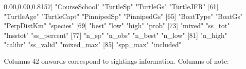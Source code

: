 \documentclass[
]{book}
\newenvironment{Shaded}{\begin{snugshade}}{\end{snugshade}}
\newcommand{\DecValTok}[1]{\textcolor[rgb]{0.00,0.00,0.81}{#1}}
\newcommand{\NormalTok}[1]{#1}
\newcommand{\StringTok}[1]{\textcolor[rgb]{0.31,0.60,0.02}{#1}}
\begin{document}
\begin{Shaded}
\begin{Highlighting}[]
\NormalTok{[}\DecValTok{57}\NormalTok{] }\StringTok{"CourseSchool"}     \StringTok{"TurtleSp"}         \StringTok{"TurtleGs"}         \StringTok{"TurtleJFR"}       
\NormalTok{[}\DecValTok{61}\NormalTok{] }\StringTok{"TurtleAge"}        \StringTok{"TurtleCapt"}       \StringTok{"PinnipedSp"}       \StringTok{"PinnipedGs"}      
\NormalTok{[}\DecValTok{65}\NormalTok{] }\StringTok{"BoatType"}         \StringTok{"BoatGs"}           \StringTok{"PerpDistKm"}       \StringTok{"species"}         
\NormalTok{[}\DecValTok{69}\NormalTok{] }\StringTok{"best"}             \StringTok{"low"}              \StringTok{"high"}             \StringTok{"prob"}            
\NormalTok{[}\DecValTok{73}\NormalTok{] }\StringTok{"mixed"}            \StringTok{"ss\_tot"}           \StringTok{"lnsstot"}          \StringTok{"ss\_percent"}      
\NormalTok{[}\DecValTok{77}\NormalTok{] }\StringTok{"n\_sp"}             \StringTok{"n\_obs"}            \StringTok{"n\_best"}           \StringTok{"n\_low"}           
\NormalTok{[}\DecValTok{81}\NormalTok{] }\StringTok{"n\_high"}           \StringTok{"calibr"}           \StringTok{"ss\_valid"}         \StringTok{"mixed\_max"}       
\NormalTok{[}\DecValTok{85}\NormalTok{] }\StringTok{"spp\_max"}          \StringTok{"included"}        
\end{Highlighting}
\end{Shaded}

Columns 42 onwards correspond to sightings information. Columns of note:
\end{document}
